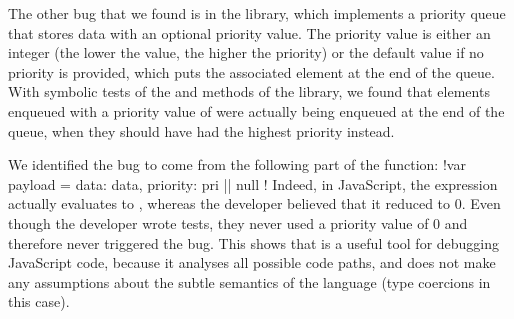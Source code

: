 The other bug that we found is in the  library, which implements a priority queue that stores data with an optional priority value.
The priority value is either an integer (the lower the value, the higher the priority) or the default  value if no priority is provided, which puts the associated element at the end of the queue.
With symbolic tests of the  and  methods of the library, we found that elements enqueued with a priority value of  were actually being enqueued at the end of the queue, when they should have had the highest priority instead.

We identified the bug to come from the following part of the  function: \jsinline!var payload = { data: data, priority: pri || null }!
Indeed, in JavaScript, the expression  actually evaluates to , whereas the developer believed that it reduced to 0.
Even though the developer wrote tests, they never used a priority value of 0 and therefore never triggered the bug.
This shows that \cosette is a useful tool for debugging JavaScript code, because it analyses all possible code paths, and does not make any assumptions about the subtle semantics of the language (type coercions in this case).






